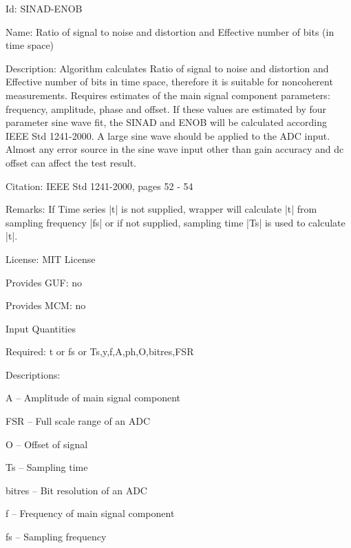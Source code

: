\begin{tightdesc}
\item [Id:] SINAD-ENOB
\item [Name:] Ratio of signal to noise and distortion and Effective number of bits (in time space)
\item [Description:]  Algorithm calculates Ratio of signal to noise and distortion and Effective number of bits in time space, therefore it is suitable for noncoherent measurements. Requires estimates of the main signal component parameters: frequency, amplitude, phase and offset. If these values are estimated by four parameter sine wave fit, the SINAD and ENOB will be calculated according IEEE Std 1241-2000. A large sine wave should be applied to the ADC input. Almost any error source in the sine wave input other than gain accuracy and dc offset can affect the test result.
\item [Citation:] IEEE Std 1241-2000, pages 52 - 54
\item [Remarks:] If Time series |t| is not supplied, wrapper will calculate |t| from sampling frequency |fs| or if not supplied, sampling time |Ts| is used to calculate |t|.
\item [License:] MIT License
\item [Provides GUF:] no
\item [Provides MCM:] no
\item [Input Quantities] \rule{0em}{0em}
    \begin{tightdesc}
    \item [Required:] 
        \textsf{t} or \textsf{fs} or \textsf{Ts},\enspace \textsf{y},\enspace \textsf{f},\enspace \textsf{A},\enspace \textsf{ph},\enspace \textsf{O},\enspace \textsf{bitres},\enspace \textsf{FSR}
    \end{tightdesc}
\item [Descriptions:] \rule{0em}{0em}
    \begin{tightdesc}
        \item[\textsf{A}] -- Amplitude of main signal component
        \item[\textsf{FSR}] -- Full scale range of an ADC
        \item[\textsf{O}] -- Offset of signal
        \item[\textsf{Ts}] -- Sampling time
        \item[\textsf{bitres}] -- Bit resolution of an ADC
        \item[\textsf{f}] -- Frequency of main signal component
        \item[\textsf{fs}] -- Sampling frequency

\end{tightdesc}
\end{tightdesc}
